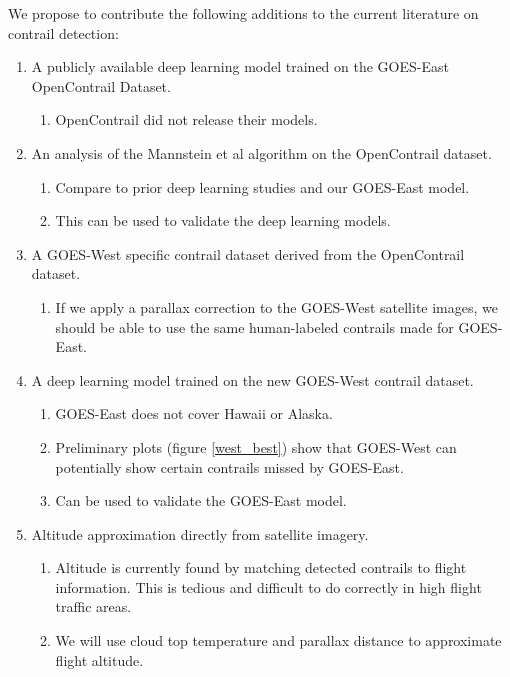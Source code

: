 We propose to contribute the following additions to the current literature on contrail detection:
\begin{enumerate}[label*=\arabic*.]
    \item A publicly available deep learning model trained on the GOES-East OpenContrail Dataset.
        \begin{enumerate}[label*=\arabic*.]
            \item OpenContrail did not release their models.
        \end{enumerate}
    \item An analysis of the Mannstein et al algorithm on the OpenContrail dataset.
        \begin{enumerate}[label*=\arabic*.]
            \item Compare to prior deep learning studies and our GOES-East model.
            \item This can be used to validate the deep learning models.
        \end{enumerate}
    \item A GOES-West specific contrail dataset derived from the OpenContrail dataset.
        \begin{enumerate}[label*=\arabic*.]
            \item If we apply a parallax correction to the GOES-West satellite images, we should be able to use the same human-labeled contrails made for GOES-East. 
        \end{enumerate}
    \item A deep learning model trained on the new GOES-West contrail dataset.
        \begin{enumerate}[label*=\arabic*.]
            \item GOES-East does not cover Hawaii or Alaska.
            \item Preliminary plots (figure \ref{west_best}) show that GOES-West can potentially show certain contrails missed by GOES-East.
            \item Can be used to validate the GOES-East model. 
        \end{enumerate}
    \item Altitude approximation directly from satellite imagery.
        \begin{enumerate}[label*=\arabic*.]
            \item Altitude is currently found by matching detected contrails to flight information. This is tedious and difficult to do correctly in high flight traffic areas. 
            \item We will use cloud top temperature and parallax distance to approximate flight altitude.
        \end{enumerate}

    \end{enumerate}







